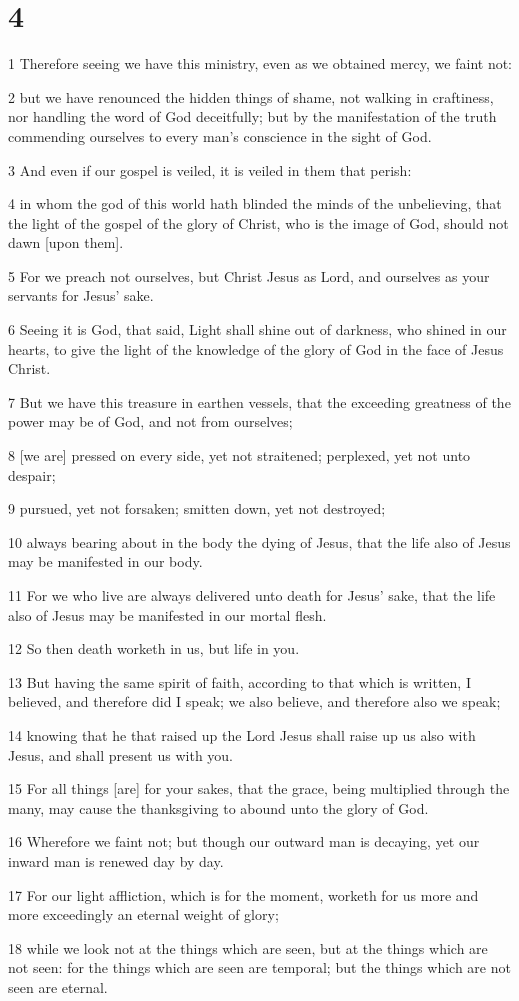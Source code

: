 \chapter{4}

\par 1 Therefore seeing we have this ministry, even as we obtained mercy, we faint not:
\par 2 but we have renounced the hidden things of shame, not walking in craftiness, nor handling the word of God deceitfully; but by the manifestation of the truth commending ourselves to every man's conscience in the sight of God.
\par 3 And even if our gospel is veiled, it is veiled in them that perish:
\par 4 in whom the god of this world hath blinded the minds of the unbelieving, that the light of the gospel of the glory of Christ, who is the image of God, should not dawn [upon them].
\par 5 For we preach not ourselves, but Christ Jesus as Lord, and ourselves as your servants for Jesus' sake.
\par 6 Seeing it is God, that said, Light shall shine out of darkness, who shined in our hearts, to give the light of the knowledge of the glory of God in the face of Jesus Christ.
\par 7 But we have this treasure in earthen vessels, that the exceeding greatness of the power may be of God, and not from ourselves;
\par 8 [we are] pressed on every side, yet not straitened; perplexed, yet not unto despair;
\par 9 pursued, yet not forsaken; smitten down, yet not destroyed;
\par 10 always bearing about in the body the dying of Jesus, that the life also of Jesus may be manifested in our body.
\par 11 For we who live are always delivered unto death for Jesus' sake, that the life also of Jesus may be manifested in our mortal flesh.
\par 12 So then death worketh in us, but life in you.
\par 13 But having the same spirit of faith, according to that which is written, I believed, and therefore did I speak; we also believe, and therefore also we speak;
\par 14 knowing that he that raised up the Lord Jesus shall raise up us also with Jesus, and shall present us with you.
\par 15 For all things [are] for your sakes, that the grace, being multiplied through the many, may cause the thanksgiving to abound unto the glory of God.
\par 16 Wherefore we faint not; but though our outward man is decaying, yet our inward man is renewed day by day.
\par 17 For our light affliction, which is for the moment, worketh for us more and more exceedingly an eternal weight of glory;
\par 18 while we look not at the things which are seen, but at the things which are not seen: for the things which are seen are temporal; but the things which are not seen are eternal.

